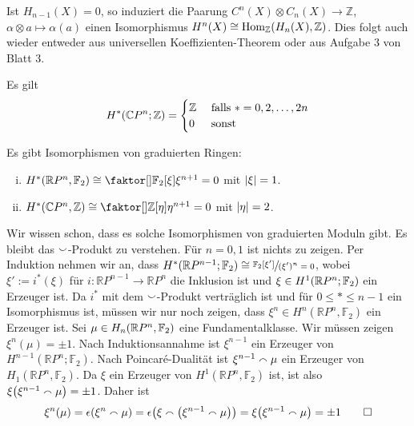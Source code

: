 \begin{bemerkung}
	Ist $H_{n-1}(X)=0$, so induziert die Paarung $C^n(X) \otimes C_n(X) \to \mathbb{Z}$, $\alpha \otimes a \mapsto \alpha(a)$ einen Isomorphismus $H^n(X) \cong \Hom_\mathbb{Z} \enbrace*{H_n (X),\mathbb{Z}}$.
	Dies folgt auch wieder entweder aus universellen Koeffizienten-Theorem oder aus Aufgabe $3$ von Blatt $3$.
\end{bemerkung}

\begin{beispiel}[{name=[Kohomologie des komplex projektiven Raumes]}]
	Es gilt
	\[
		H^* \enbrace*{\mathbb{C}P^n;\mathbb{Z}} = \begin{cases}
			\mathbb{Z} &\text{ falls }*=0,2,\ldots ,2n\\
			0 &\text{ sonst}
		\end{cases}
	\]
\end{beispiel}

\begin{satz}[{name=[Ringstruktur der Kohomologie für die projektiven Räume]}]
	Es gibt Isomorphismen von graduierten Ringen: 
	\begin{enumerate}[(i)]
		\item $H^* \enbrace*{\mathbb{R}P^n,\mathbb{F}_2} \cong \Faktor{\mathbb{F}_2[\xi]}{\xi^{n+1}=0}$ mit $\abs*{\xi}=1$.
		\item $H^* \enbrace*{\mathbb{C}P^n,\mathbb{Z}} \cong \Faktor{\mathbb{Z}[\eta]}{\eta^{n+1}=0}$ mit $\abs{\eta}=2$.
	\end{enumerate}
\end{satz}
\begin{beweis}
	Wir wissen schon, dass es solche Isomorphismen von graduierten Moduln gibt. 
	Es bleibt das $\cupp$-Produkt zu verstehen. Für $n=0,1$ ist nichts zu zeigen. 
	Per Induktion nehmen wir an, dass $H^*(\mathbb{R}P^{n-1};\mathbb{F}_2) \cong \sfrac{\mathbb{F}_2[\xi']}{(\xi')^n=0}$, wobei $\xi' := i^*(\xi)$ für $i \colon \mathbb{R}P^{n-1} \to \mathbb{R}P^n$ die Inklusion ist und $\xi \in H^1 \enbrace*{\mathbb{R}P^n;\mathbb{F}_2}$ ein Erzeuger ist.
	Da $i^*$ mit dem $\cupp$-Produkt verträglich ist und für $0 \le * \le {n-1}$ ein Isomorphismus ist, müssen wir nur noch zeigen, dass $\xi^n\in H^n(\mathbb{R}P^n,\mathbb{F}_2)$ ein Erzeuger ist.
	Sei $\mu \in H_n \enbrace*{\mathbb{R}P^n,\mathbb{F}_2}$ eine Fundamentalklasse. Wir müssen zeigen $\xi^n(\mu)=  \pm 1$.
	Nach Induktionsannahme ist $\xi^{n-1}$ ein Erzeuger von $H^{n-1}(\mathbb{R}P^n;\mathbb{F}_2)$. 
	Nach Poincaré-Dualität ist $\xi^{n-1} \capp \mu$ ein Erzeuger von $H_1(\mathbb{R}P^n,\mathbb{F}_2)$. 
	Da $\xi$ ein Erzeuger von $H^1(\mathbb{R}P^n,\mathbb{F}_2)$ ist, ist also $\xi \enbrace*{\xi^{n-1} \capp \mu} = \pm 1$. 
	Daher ist 
	\[
		\xi^n(\mu) = \epsilon \enbrace*{\xi^n \capp \mu} = \epsilon \enbrace*{ \xi \capp \enbrace*{\xi^{n-1} \capp \mu}} = \xi \enbrace*{\xi^{n-1} \capp \mu} = \pm 1 \qedhere
	\]
\end{beweis}

